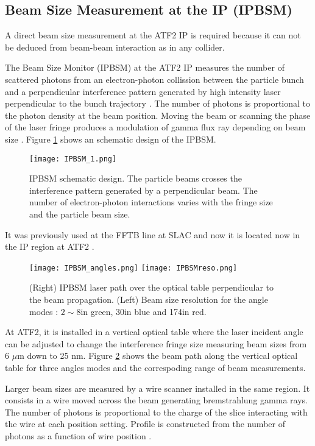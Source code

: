 {{\subsection{Beam Size Measurement at the IP (IPBSM)}
A direct beam size measurement at the ATF2 IP is required because it can not be deduced from beam-beam interaction as in any collider.\par
The Beam Size Monitor (IPBSM) at the ATF2 IP measures the number of scattered photons from an electron-photon collission between the particle bunch and a perpendicular interference pattern generated by high intensity laser perpendicular to the bunch trajectory \cite{Shintake1992453}. The number of photons is proportional to the photon density at the beam position. Moving the beam or scanning the phase of the laser fringe produces a modulation of gamma flux ray depending on beam size \cite{Yves}. Figure \ref{f:IPBSM} shows an schematic design of the IPBSM.\par
\begin{figure}[htb]
 \begin{center}
  \texttt{[image: IPBSM\_1.png]}\caption{IPBSM schematic design. The particle beams crosses the interference pattern generated by a perpendicular beam. The number of electron-photon interactions varies with the fringe size and the particle beam size.}\label{f:IPBSM}
 \end{center}
\end{figure}
It was previously used at the FFTB line at SLAC \cite{Shintake:1995sg} and now it is located now in the IP region at ATF2 \cite{Jackelinethese}.\par
\begin{figure}[htb]
 \begin{center}
  \texttt{[image: IPBSM\_angles.png]}
  \texttt{[image: IPBSMreso.png]}
  \caption{(Right) IPBSM laser path over the optical table perpendicular to the beam propagation. (Left) Beam size resolution for the angle modes : $2\sim8$\degree in green, 30\degree in blue and 174\degree in red.}\label{f:IPBSMangles}
 \end{center}
\end{figure}
At ATF2, it is installed in a vertical optical table where the laser incident angle can be adjusted to change the interference fringe size measuring beam sizes from 6 $\mu$m down to 25 nm. Figure \ref{f:IPBSMangles} shows the beam path along the vertical optical table for three angles modes and the correspoding range of beam measurements.\par
Larger beam sizes are measured by a wire scanner installed in the same region. It consists in a wire moved across the beam generating bremstrahlung gamma rays. The number of photons is proportional to the charge of the slice interacting with the wire at each position setting. Profile is constructed from the number of photons as a function of wire position \cite{Hayano:2000xf}.

}}
